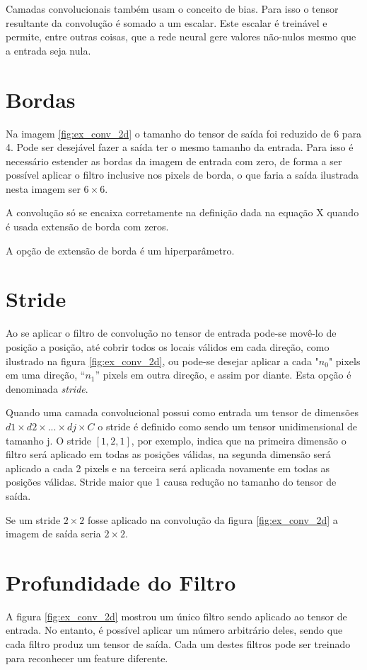 Camadas convolucionais também usam o conceito de bias. Para isso o tensor
resultante da convolução é somado a um escalar. Este escalar é treinável e
permite, entre outras coisas, que a rede neural gere valores não-nulos mesmo que
a entrada seja nula.

\section{Bordas}
Na imagem \ref{fig:ex_conv_2d} o tamanho do tensor de saída foi reduzido
de 6 para 4. Pode ser
desejável fazer a saída ter o mesmo tamanho da entrada. Para isso é necessário
estender as bordas da imagem de entrada com zero, de forma a ser possível
aplicar o filtro inclusive nos pixels de borda, o que faria a saída ilustrada
nesta imagem ser $6 \times 6$.

A convolução só se encaixa corretamente na definição dada na equação X quando é
usada extensão de borda com zeros.

A opção de extensão de borda é um hiperparâmetro.

\section{Stride}
Ao se aplicar o filtro de convolução no tensor de entrada pode-se movê-lo de
posição a posição, até cobrir todos os locais válidos em cada direção, como
ilustrado na figura \ref{fig:ex_conv_2d}, ou pode-se desejar aplicar a cada
"$n_0$" pixels em uma direção, “$n_1$” pixels em outra direção, e assim por diante.
Esta opção é denominada \emph{stride}.

Quando uma camada convolucional possui como entrada um tensor de dimensões
$d1\times d2 \times ... \times dj \times C$ o stride é definido como sendo
um tensor unidimensional de tamanho j.
O stride $[1,2,1]$, por exemplo, indica que na primeira dimensão o
filtro será aplicado em todas as posições válidas, na segunda dimensão será
aplicado a cada 2 pixels e na terceira será aplicada novamente em todas as
posições válidas. Stride maior que 1 causa redução no tamanho do tensor de
saída.

Se um stride $2 \times 2$ fosse aplicado na convolução da figura
\ref{fig:ex_conv_2d} a imagem de saída seria $2 \times 2$.

\section{Profundidade do Filtro}
A figura \ref{fig:ex_conv_2d} mostrou um único filtro sendo aplicado ao
tensor de entrada. No
entanto, é possível aplicar um número arbitrário deles, sendo que cada filtro
produz um tensor de saída. Cada um destes filtros pode ser treinado para
reconhecer um feature diferente.

